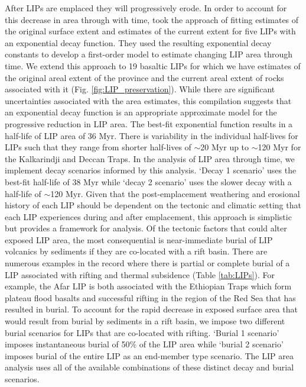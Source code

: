 \documentclass[11pt,letterpaper]{article}
\begin{document}
After LIPs are emplaced they will progressively erode. In order to account for this decrease in area through with time, \cite{Godderis2017a} took the approach of fitting estimates of the original surface extent and estimates of the current extent for five LIPs with an exponential decay function. They used the resulting exponential decay constants to develop a first-order model to estimate changing LIP area through time. We extend this approach to 19 basaltic LIPs for which we have estimates of the original areal extent of the province and the current areal extent of rocks associated with it (Fig. \ref{fig:LIP_preservation}). While there are significant uncertainties associated with the area estimates, this compilation suggests that an exponential decay function is an appropriate approximate model for the progressive reduction in LIP area. The best-fit exponential function results in a half-life of LIP area of 36 Myr. There is variability in the individual half-lives for LIPs such that they range from shorter half-lives of $\sim$20 Myr up to $\sim$120 Myr for the Kalkarindji and Deccan Traps. In the analysis of LIP area through time, we implement decay scenarios informed by this analysis. `Decay 1 scenario' uses the best-fit half-life of 38 Myr while `decay 2 scenario' uses the slower decay with a half-life of $\sim$120 Myr. Given that the post-emplacement weathering and erosional history of each LIP should be dependent on the tectonic and climatic setting that each LIP experiences during and after emplacement, this approach is simplistic but provides a framework for analysis. Of the tectonic factors that could alter exposed LIP area, the most consequential is near-immediate burial of LIP volcanics by sediments if they are co-located with a rift basin. There are numerous examples in the record where there is partial or complete burial of a LIP associated with rifting and thermal subsidence (Table \ref{tab:LIPs}). For example, the Afar LIP is both associated with the Ethiopian Traps which form plateau flood basalts and successful rifting in the region of the Red Sea that has resulted in burial. To account for the rapid decrease in exposed surface area that would result from burial by sediments in a rift basin, we impose two different burial scenarios for LIPs that are co-located with rifting. `Burial 1 scenario' imposes instantaneous burial of 50$\%$ of the LIP area while `burial 2 scenario' imposes burial of the entire LIP as an end-member type scenario. The LIP area analysis uses all of the available combinations of these distinct decay and burial scenarios.
\end{document}
